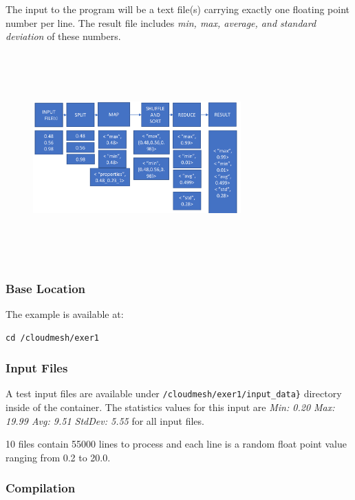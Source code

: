 The input to the program will be a text file(s) carrying exactly one
floating point number per line. The result file includes \textit{min,
  max, average, and standard deviation} of these numbers.


  \begin{figure}[!htbp]
    \includegraphics[width=8cm,height=8cm]{section/container/images/docker-hadoop-1.png}
    \centering
  \end{figure}

\subsubsection{Base Location}

The example is available at:

\begin{lstlisting}
cd /cloudmesh/exer1
\end{lstlisting}

\subsubsection{Input Files}

A test input files are available under
\verb|/cloudmesh/exer1/input_data}|
directory inside of the container.  The statistics values for this
input are \textit{Min: 0.20 Max: 19.99 Avg: 9.51 StdDev: 5.55} for all
input files.

10 files contain 55000 lines to process and each line is a random
float point value ranging from 0.2 to 20.0.

\subsubsection{Compilation}

